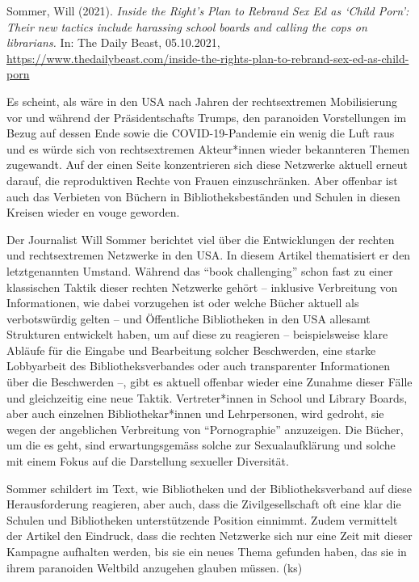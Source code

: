 \documentclass[a4paper,
fontsize=11pt,
oneside,
numbers=noperiodatend,
parskip=half-,
bibliography=totoc,
final
]{scrartcl}
\begin{document}
Sommer, Will (2021). \emph{Inside the Right's Plan to Rebrand Sex Ed as
\enquote*{Child Porn}: Their new tactics include harassing school boards
and calling the cops on librarians.} In: The Daily Beast, 05.10.2021,
\url{https://www.thedailybeast.com/inside-the-rights-plan-to-rebrand-sex-ed-as-child-porn}

Es scheint, als wäre in den USA nach Jahren der rechtsextremen
Mobilisierung vor und während der Präsidentschafts Trumps, den
paranoiden Vorstellungen im Bezug auf dessen Ende sowie die
COVID-19-Pandemie ein wenig die Luft raus und es würde sich von
rechtsextremen Akteur*innen wieder bekannteren Themen zugewandt. Auf der
einen Seite konzentrieren sich diese Netzwerke aktuell erneut darauf,
die reproduktiven Rechte von Frauen einzuschränken. Aber offenbar ist
auch das Verbieten von Büchern in Bibliotheksbeständen und Schulen in
diesen Kreisen wieder en vouge geworden.

Der Journalist Will Sommer berichtet viel über die Entwicklungen der
rechten und rechtsextremen Netzwerke in den USA. In diesem Artikel
thematisiert er den letztgenannten Umstand. Während das \enquote{book
challenging} schon fast zu einer klassischen Taktik dieser rechten
Netzwerke gehört -- inklusive Verbreitung von Informationen, wie dabei
vorzugehen ist oder welche Bücher aktuell als verbotswürdig gelten --
und Öffentliche Bibliotheken in den USA allesamt Strukturen entwickelt
haben, um auf diese zu reagieren -- beispielsweise klare Abläufe für die
Eingabe und Bearbeitung solcher Beschwerden, eine starke Lobbyarbeit des
Bibliotheksverbandes oder auch transparenter Informationen über die
Beschwerden --, gibt es aktuell offenbar wieder eine Zunahme dieser
Fälle und gleichzeitig eine neue Taktik. Vertreter*innen in School und
Library Boards, aber auch einzelnen Bibliothekar*innen und Lehrpersonen,
wird gedroht, sie wegen der angeblichen Verbreitung von
\enquote{Pornographie} anzuzeigen. Die Bücher, um die es geht, sind
erwartungsgemäss solche zur Sexualaufklärung und solche mit einem Fokus
auf die Darstellung sexueller Diversität.

Sommer schildert im Text, wie Bibliotheken und der Bibliotheksverband
auf diese Herausforderung reagieren, aber auch, dass die
Zivilgesellschaft oft eine klar die Schulen und Bibliotheken
unterstützende Position einnimmt. Zudem vermittelt der Artikel den
Eindruck, dass die rechten Netzwerke sich nur eine Zeit mit dieser
Kampagne aufhalten werden, bis sie ein neues Thema gefunden haben, das
sie in ihrem paranoiden Weltbild anzugehen glauben müssen. (ks)
\end{document}
